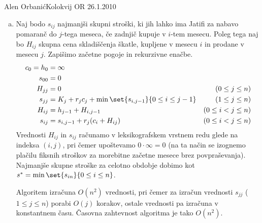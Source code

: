 \begin{naloga}{Alen Orbanić}{Kolokvij OR 26.1.2010}
\begin{odgovor}
\begin{enumerate}[(a)]
\item Naj bodo $s_{ij}$ najmanjši skupni stroški,
ki jih lahko ima Jatifi za nabavo pomaranč do $j$-tega meseca,
če zadnjič kupuje v $i$-tem mesecu.
Poleg tega naj bo $H_{ij}$ skupna cena skladiščenja škatle,
kupljene v mesecu $i$ in prodane v mesecu $j$.
Zapišimo začetne pogoje in rekurzivne enačbe.
\begin{align*}
c_0 = h_0 &= \infty \\
s_{00} &= 0 \\
H_{jj} &= 0 & (0 \le j \le n) \\
s_{jj} &= K_j + r_j c_j + \min\set{s_{i,j-1}}{0 \le i \le j-1} & (1 \le j \le n) \\
H_{ij} &= h_{j-1} + H_{i,j-1} & (0 \le i < j \le n) \\
s_{ij} &= s_{i,j-1} + r_j (c_i + H_{ij}) & (0 \le i < j \le n)
\end{align*}
Vrednosti $H_{ij}$ in $s_{ij}$ računamo
v leksikografskem vrstnem redu glede na in\-dek\-sa $(i, j)$,
pri čemer upoštevamo $0 \cdot \infty = 0$
(na ta način se izognemo plačilu fiks\-nih stroškov
za morebitne začetne mesece brez povpraševanja).
Najmanjše skupne stroške za celotno obdobje
dobimo kot $s^* = \min\set{s_{in}}{0 \le i \le n}$.

Algoritem izračuna $O(n^2)$ vrednosti,
pri čemer za izračun vrednosti $s_{jj}$ ($1 \le j \le n$) porabi $O(j)$ korakov,
ostale vrednosti pa izračuna v konstantnem času.
Časovna zahtevnost algoritma je tako $O(n^2)$.


\end{enumerate}
\end{odgovor}
\end{naloga}
